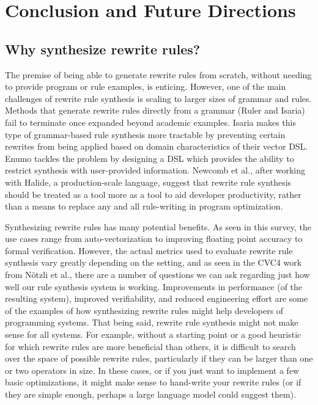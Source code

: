 \documentclass[acmsmall,screen,nonacm]{acmart}
\begin{document}
\section{Conclusion and Future Directions}
\subsection{Why synthesize rewrite rules?}
The premise of being able to generate rewrite rules from scratch, without needing to provide program or rule examples, is enticing. However, one of the main challenges of rewrite rule synthesis is scaling to larger sizes of grammar and rules. Methods that generate rewrite rules directly from a grammar (Ruler and Isaria) fail to terminate once expanded beyond academic examples. 
Isaria makes this type of grammar-based rule synthesis more tractable by preventing certain rewrites from being applied based on domain characteristics of their vector DSL. Enumo tackles the problem by designing a DSL which provides the ability to restrict synthesis with user-provided information.
Newcomb et al., after working with Halide, a production-scale language, suggest that rewrite rule synthesis should be treated as a tool more as a tool to aid developer productivity, rather than a means to replace any and all rule-writing in program optimization.

Synthesizing rewrite rules has many potential benefits. As seen in this survey, the use cases range from auto-vectorization to improving floating point accuracy to formal verification. However, the actual metrics used to evaluate rewrite rule synthesis vary greatly depending on the setting, and as seen in the CVC4 work from N{\"o}tzli et al., there are a number of questions we can ask regarding just how well our rule synthesis system is working. Improvements in performance (of the resulting system), improved verifiability, and reduced engineering effort are some of the examples of how synthesizing rewrite rules might help developers of programming systems. That being said, rewrite rule synthesis might not make sense for all systems. For example, without a starting point or a good heuristic for which rewrite rules are more beneficial than others, it is difficult to search over the space of possible rewrite rules, particularly if they can be larger than one or two operators in size. In these cases, or if you just want to implement a few basic optimizations, it might make sense to hand-write your rewrite rules (or if they are simple enough, perhaps a large language model could suggest them).
\end{document}
